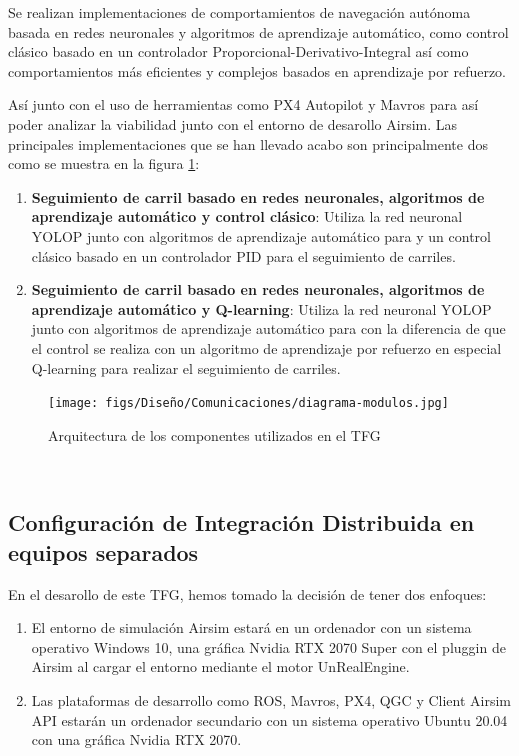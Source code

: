 Se realizan implementaciones de comportamientos de navegación autónoma basada en redes neuronales y algoritmos de aprendizaje automático, como control clásico basado en 
un controlador Proporcional-Derivativo-Integral así como comportamientos más eficientes y complejos basados en aprendizaje por refuerzo.

Así junto con el uso de herramientas como PX4 Autopilot y Mavros para así poder analizar la viabilidad junto con el entorno de desarollo Airsim. Las principales implementaciones que se han 
llevado acabo son principalmente dos como se muestra en la figura \ref{fig:infraestructura}:

\begin{enumerate}
  \item \textbf{Seguimiento de carril basado en redes neuronales, algoritmos de aprendizaje automático y control clásico}: Utiliza la red neuronal YOLOP junto con algoritmos de aprendizaje automático para 
   y un control clásico basado en un controlador PID para el seguimiento de carriles.
  \item \textbf{Seguimiento de carril basado en redes neuronales, algoritmos de aprendizaje automático y Q-learning}: Utiliza la red neuronal YOLOP junto con algoritmos de aprendizaje automático para 
  con la diferencia de que el control se realiza con un algoritmo de aprendizaje por refuerzo en especial Q-learning para realizar el seguimiento de carriles.
\end{enumerate}

\begin{figure} [H]
    \begin{center}
      \texttt{[image: figs/Diseño/Comunicaciones/diagrama-modulos.jpg]}
    \end{center}
    \caption{Arquitectura de los componentes utilizados en el TFG}
    \label{fig:infraestructura}
  \end{figure}\

\subsection{Configuración de Integración Distribuida en equipos separados}
En el desarollo de este TFG, hemos tomado la decisión de tener dos enfoques:

\begin{enumerate}
  \item El entorno de simulación Airsim estará en un ordenador con un sistema operativo Windows 10, una gráfica Nvidia RTX 2070 Super con el pluggin de 
  Airsim al cargar el entorno mediante el motor UnRealEngine.
  \item Las plataformas de desarrollo como ROS, Mavros, PX4, QGC y Client Airsim API estarán un  ordenador secundario con un sistema operativo Ubuntu 20.04 con una gráfica Nvidia RTX
  2070.
\end{enumerate}

